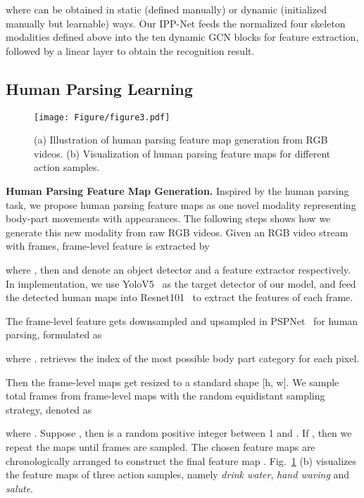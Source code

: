 \documentclass[runningheads]{llncs}
\begin{document}
where  can be obtained in static (defined manually) or dynamic (initialized manually but learnable) ways. Our IPP-Net feeds the normalized four skeleton modalities defined above into the ten dynamic GCN blocks for feature extraction, followed by a linear layer to obtain the recognition result.

\subsection{Human Parsing Learning}
\label{section:Parsing}
\begin{figure}[t]
\texttt{[image: Figure/figure3.pdf]}
\vspace{-1em}
\caption{(a) Illustration of human parsing feature map generation from RGB videos. (b) Visualization of human parsing feature maps for different action samples.}  \label{parsing}
\end{figure}

\textbf{Human Parsing Feature Map Generation.} Inspired by the human parsing task, we propose human parsing feature maps as one novel modality representing body-part movements with appearances. The following steps shows how we generate this new modality from raw RGB videos. Given an RGB video stream  with  frames, frame-level feature is extracted by

where , then  and  denote an object detector and a feature extractor respectively. In implementation, we use YoloV5~\cite{yolov5} as the target detector of our model, and feed the detected human maps into Resnet101~\cite{he2015deep} to extract the features  of each frame. 

The frame-level feature  gets downsampled and upsampled in PSPNet~\cite{Zhao_2017_CVPR} for human parsing, formulated as

where .  retrieves the index of the most possible body part category for each pixel. 

Then the frame-level maps get resized to a standard shape [h, w]. We sample total  frames from  frame-level maps with the random equidistant sampling strategy, denoted as 

where . Suppose , then  is a random positive integer between 1 and . If , then we repeat the  maps until  frames are sampled. The chosen  feature maps are chronologically arranged to construct the final feature map . Fig.~\ref{parsing} (b) visualizes the feature maps of three action samples, namely \textit{drink water}, \textit{hand waving} and \textit{salute}.
\end{document}
